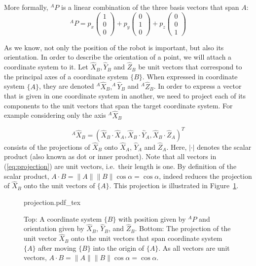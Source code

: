 More formally, $^AP$ is a linear combination of the three basis vectors that span $A$:
\begin{equation}
^AP=p_x\left(\begin{array}{c}1\\0\\0\end{array}\right)+p_y\left(\begin{array}{c}0\\1\\0\end{array}\right)+p_z\left(\begin{array}{c}0\\0\\1\end{array}\right)\label{eq:basis}
\end{equation}

As we know, not only the position of the robot is important, but also its orientation. In order to describe the orientation of a point, we will attach a coordinate system to it. Let $ \hat{X}_B, \hat{Y}_B$ and $ \hat{Z}_B$ be unit vectors that correspond to the principal axes of a coordinate system $\{B\}$. When expressed in coordinate system $\{A\}$, they are denoted $^A\hat{X}_B, ^A\hat{Y}_B$ and $ ^A\hat{Z}_B$. In order to express a vector that is given in one coordinate system in another, we need to project each of its components to the unit vectors that span the target coordinate system. For example considering only the axis $^A\hat{X}_B$

\begin{equation}\label{eq:projection}
^A\hat{X}_B=(\hat{X}_B\cdot\hat{X}_A, \hat{X}_B\cdot\hat{Y}_A,\hat{X}_B\cdot\hat{Z}_A)^T
\end{equation}
consists of the projections of $\hat{X}_B$ onto $\hat{X}_A$, $\hat{Y}_A$ and $\hat{Z}_A$. Here,  $|\cdot|$ denotes the scalar product (also known as dot or inner product).  Note that all vectors in (\ref{eq:projection}) are unit vectors, i.e.\ their length is one. By definition of the scalar product, $A\cdot B=\|A\|\|B\|\cos \alpha=\cos \alpha$, indeed reduces the projection of $\hat{X}_B$ onto the unit vectors of $\{A\}$. This projection is illustrated in Figure~\ref{fig:projection}.

\begin{figure}
    \centering
    \def\svgwidth{0.8\textwidth}
    {projection.pdf_tex}
    \caption{Top: A coordinate system $\{B\}$ with position given by $^AP$ and orientation given by $\hat{X}_B$, $\hat{Y}_B$, and $\hat{Z}_B$. Bottom:
    The projection of the unit vector $\hat{X}_B$ onto the unit vectors that span coordinate system $\{A\}$ after moving $\{B\}$ into the origin of $\{A\}$. As all vectors are unit vectors, $A\cdot B=\|A\|\|B\|\cos \alpha=\cos \alpha$. }
    \label{fig:projection}
\end{figure}


